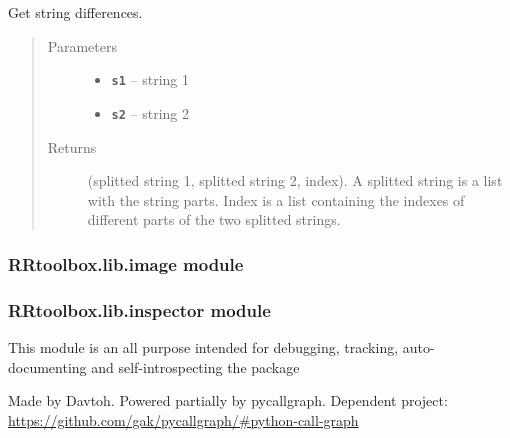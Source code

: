 \documentclass[letterpaper,10pt,english]{sphinxmanual}
\begin{document}
\begin{fulllineitems}
\label{RRtoolbox.lib:RRtoolbox.lib.directory.strdifference}
Get string differences.
\begin{quote}\begin{description}
\item[{Parameters}] \leavevmode\begin{itemize}
\item {} 
\textbf{\texttt{s1}} -- string 1

\item {} 
\textbf{\texttt{s2}} -- string 2

\end{itemize}

\item[{Returns}] \leavevmode
(splitted string 1, splitted string 2, index).
A splitted string is a list with the string parts.
Index is a list containing the indexes of different parts of the two splitted strings.

\end{description}\end{quote}

\end{fulllineitems}



\subsubsection{RRtoolbox.lib.image module}
\label{RRtoolbox.lib:rrtoolbox-lib-image-module}

\subsubsection{RRtoolbox.lib.inspector module}
\label{RRtoolbox.lib:module-RRtoolbox.lib.inspector}\label{RRtoolbox.lib:rrtoolbox-lib-inspector-module}
This module is an all purpose intended for debugging, tracking, auto-documenting and self-introspecting the
package

Made by Davtoh. Powered partially by pycallgraph.
Dependent project: \href{https://github.com/gak/pycallgraph/\#python-call-graph}{https://github.com/gak/pycallgraph/\#python-call-graph}
\end{document}
